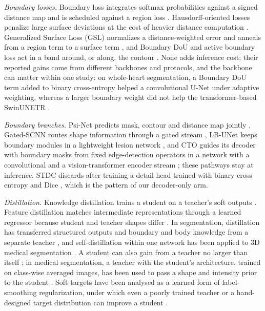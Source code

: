 \documentclass[fleqn,10pt,lineno]{wlpeerj}
\begin{document}
\emph{Boundary losses.} Boundary loss integrates softmax probabilities against a signed distance map and is scheduled against a region loss \citep{Kervadec2019Boundary}. Hausdorff-oriented losses penalize large surface deviations at the cost of heavier distance computation \citep{Karimi2020Reducing}. Generalized Surface Loss (GSL) normalizes a distance-weighted error and anneals from a region term to a surface term \citep{Celaya2024A}, and Boundary DoU and active boundary loss act in a band around, or along, the contour \citep{Sun2023Boundary, Wang2022Active}. None adds inference cost; their reported gains come from different backbones and protocols, and the backbone can matter within one study: on whole-heart segmentation, a Boundary DoU term added to binary cross-entropy helped a convolutional U-Net under adaptive weighting, whereas a larger boundary weight did not help the transformer-based SwinUNETR \citep{Sutassananon2025Adaptive}.

\emph{Boundary branches.} Psi-Net predicts mask, contour and distance map jointly \citep{Murugesan2019PsiNet}, Gated-SCNN routes shape information through a gated stream \citep{Takikawa2019GatedSCNN}, LB-UNet keeps boundary modules in a lightweight lesion network \citep{Xu2024LBUNet}, and CTO guides its decoder with boundary masks from fixed edge-detection operators in a network with a convolutional and a vision-transformer encoder stream \citep{Lin2025Rethinking}; these pathways stay at inference. STDC discards after training a detail head trained with binary cross-entropy and Dice \citep{Fan2021STDC}, which is the pattern of our decoder-only arm.

\emph{Distillation.} Knowledge distillation trains a student on a teacher's soft outputs \citep{Hinton2015Distilling}. Feature distillation matches intermediate representations through a learned regressor because student and teacher shapes differ \citep{Romero2015FitNets}. In segmentation, distillation has transferred structured outputs \citep{Liu2019Structured} and boundary and body knowledge from a separate teacher \citep{Liu2024BPKD}, and self-distillation within one network has been applied to 3D medical segmentation \citep{Wang2023MISSU, Banerjee2024Dual}. A student can also gain from a teacher no larger than itself \citep{Furlanello2018Born}; in medical segmentation, a teacher with the student's architecture, trained on class-wise averaged images, has been used to pass a shape and intensity prior to the student \citep{Dong2025Shape}. Soft targets have been analysed as a learned form of label-smoothing regularization, under which even a poorly trained teacher or a hand-designed target distribution can improve a student \citep{Yuan2020Revisiting}.
\end{document}
